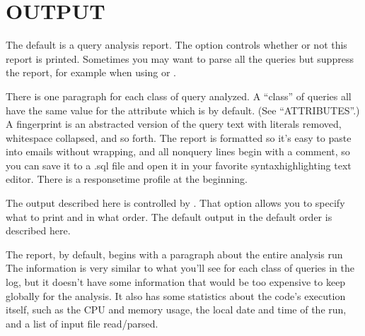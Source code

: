 \documentclass[letterpaper,10pt,english]{sphinxmanual}
\begin{document}
\section{OUTPUT}
\label{\detokenize{mariadb-query-digest:output}}
\sphinxAtStartPar
The default {\hyperref[\detokenize{mariadb-query-digest:cmdoption-mariadb-query-digest-output}]{}} is a query analysis report.  The {\hyperref[\detokenize{mariadb-query-digest:cmdoption-mariadb-query-digest-no-report}]{}}
option controls whether or not this report is printed.  Sometimes you may
want to parse all the queries but suppress the report, for example when using
{\hyperref[\detokenize{mariadb-query-digest:cmdoption-mariadb-query-digest-review}]{}} or {\hyperref[\detokenize{mariadb-query-digest:cmdoption-mariadb-query-digest-history}]{}}.

\sphinxAtStartPar
There is one paragraph for each class of query analyzed.  A “class” of queries
all have the same value for the {\hyperref[\detokenize{mariadb-query-digest:cmdoption-mariadb-query-digest-group-by}]{}} attribute which is
 by default.  (See “ATTRIBUTES”.)  A fingerprint is an
abstracted version of the query text with literals removed, whitespace
collapsed, and so forth.  The report is formatted so it’s easy to paste into
emails without wrapping, and all non\sphinxhyphen{}query lines begin with a comment, so you
can save it to a .sql file and open it in your favorite syntax\sphinxhyphen{}highlighting
text editor.  There is a response\sphinxhyphen{}time profile at the beginning.

\sphinxAtStartPar
The output described here is controlled by {\hyperref[\detokenize{mariadb-query-digest:cmdoption-mariadb-query-digest-report-format}]{}}.
That option allows you to specify what to print and in what order.
The default output in the default order is described here.

\sphinxAtStartPar
The report, by default, begins with a paragraph about the entire analysis run
The information is very similar to what you’ll see for each class of queries in
the log, but it doesn’t have some information that would be too expensive to
keep globally for the analysis.  It also has some statistics about the code’s
execution itself, such as the CPU and memory usage, the local date and time
of the run, and a list of input file read/parsed.
\end{document}

